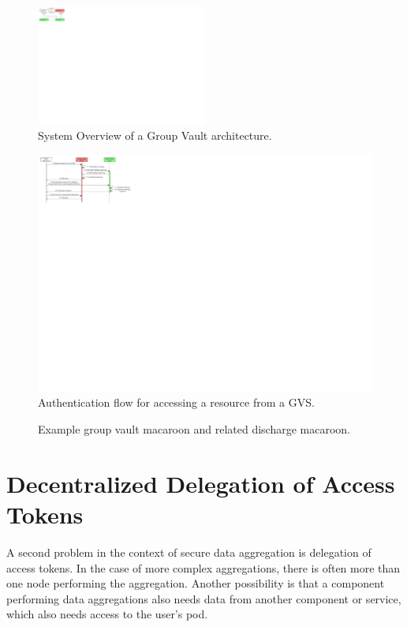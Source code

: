 \begin{figure}[h]
    \centering
    \includegraphics[width=0.50\textwidth]{images/macaroons-solid/ComponentDiagram-Group-Vault-System-Overview.pdf}
    \caption{System Overview of a Group Vault architecture.}
    \label{fig:gv-sys-overview}
\end{figure}

\begin{figure}[h]
    \centering
    \includegraphics[width=1.0\textwidth]{images/macaroons-solid/InteractionDiagram-Group-Vault-Authentication-Flow.pdf}
    \caption{Authentication flow for accessing a resource from a \acrlong{GVS}.}
    \label{fig:gv-macaroon-flow}
\end{figure}

\begin{figure}[H]
    \centering
    
    \caption{Example group vault macaroon and related discharge macaroon.}
    \label{fig:gv-macaroon-example}
\end{figure}

\section{Decentralized Delegation of Access Tokens}
\label{sec:decentralized-delegation}
A second problem in the context of secure data aggregation is delegation of access tokens. In the case of more complex aggregations, there is often more than one node performing the aggregation. Another possibility is that a component performing data aggregations also needs data from another component or service, which also needs access to the user's pod. 

